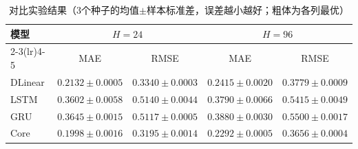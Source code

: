 \begin{table}[t]
\centering
\caption{对比实验结果（3个种子的均值$\pm$样本标准差，误差越小越好；粗体为各列最优）}
\label{tab:main}
\vspace{4pt}
\small\setlength{\tabcolsep}{9pt}
\begin{tabular}{lcccc}\toprule
模型 & \multicolumn{2}{c}{$H=24$} & \multicolumn{2}{c}{$H=96$}\\
\cmidrule(lr){2-3}\cmidrule(lr){4-5}
 & MAE & RMSE & MAE & RMSE\\\midrule
DLinear & $0.2132\pm0.0005$ & $0.3340\pm0.0003$ & $0.2415\pm0.0020$ & $0.3779\pm0.0009$\\
LSTM & $0.3602\pm0.0058$ & $0.5140\pm0.0044$ & $0.3790\pm0.0066$ & $0.5415\pm0.0049$\\
GRU & $0.3645\pm0.0015$ & $0.5117\pm0.0005$ & $0.3880\pm0.0030$ & $0.5500\pm0.0017$\\
Core & $\mathbf{0.1998\pm0.0016}$ & $\mathbf{0.3195\pm0.0014}$ & $\mathbf{0.2292\pm0.0005}$ & $\mathbf{0.3656\pm0.0004}$\\
\bottomrule\end{tabular}
\end{table}
